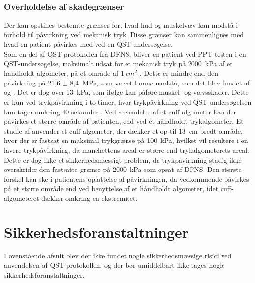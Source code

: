 \subsubsection{Overholdelse af skadegrænser}
Der kan opstilles bestemte grænser for, hvad hud og muskelvæv kan modstå i forhold til påvirkning ved mekanisk tryk. Disse grænser kan sammenlignes med hvad en patient påvirkes med ved en QST-undersøgelse. \\
Som en del af QST-protokollen fra DFNS, bliver en patient ved PPT-testen i en QST-undersøgelse, maksimalt udsat for et mekanisk tryk på 2000~kPa af et håndholdt algometer, på et område af $1~cm^{2}$ \citep{Rolke2006}. Dette er mindre end den påvirkning på 21,6 $\pm$ 8,4~MPa, som vævet kunne modstå, som det blev fundet af  og . Det er dog over 13~kPa, som ifølge  kan påføre muskel- og vævsskader. Dette er kun ved trykpåvirkning i to timer, hvor trykpåvirkning ved QST-undersøgelsen kun tager omkring 40 sekunder \cite{Rolke2006b}. Ved anvendelse af et cuff-algometer kan der påvirkes et større område af patienten, end ved et håndholdt trykalgometer. Et studie af  anvender et cuff-algometer, der dækker et op til 13~cm bredt område, hvor der er fastsat en maksimal trykgrænse på 100~kPa, hvilket vil resultere i en lavere trykpåvirkning, da manchettens areal er større end trykalgometerets areal. Dette er dog ikke et sikkerhedsmæssigt problem, da trykpåvirkning stadig ikke overskrider den fastsatte grænse på 2000~kPa som opsat af DFNS. Den største forskel kan ske i patientens opfattelse af påvirkningen, da vedkommende påvirkes på et større område end ved benyttelse af et håndholdt algometer, idet cuff-algometeret dækker omkring en ekstremitet. %

\section{Sikkerhedsforanstaltninger}
I ovenstående afsnit blev der ikke fundet nogle sikkerhedsmæssige risici ved anvendelsen af QST-protokollen, og der bør umiddelbart ikke tages nogle sikkerhedsforanstaltninger.

